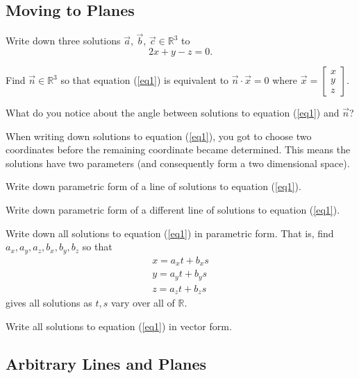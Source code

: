 \documentclass{problemset}
\newcommand{\R}{\mathbb{R}}
\begin{document}
	\subsection*{Moving to Planes}
	
	\question
	\begin{parts}
		\item Write down three solutions $\vec a$, $\vec b$, $\vec c\in\R^3$ to
		\begin{equation}\label{eq1}
			2x+y-z=0.
		\end{equation}
		\item Find $\vec n\in\R^3$ so that equation (\ref{eq1}) is equivalent
		to $\vec n\cdot \vec x=0$ where $\vec x=\begin{bmatrix}x\\ y\\ z\end{bmatrix}$.
		\item What do you notice about the angle between solutions to equation (\ref{eq1}) and $\vec n$?
	\end{parts}

	When writing down solutions to equation (\ref{eq1}), you got to choose two coordinates before the remaining
	coordinate became determined.  This means the solutions have two parameters (and consequently form a
	two dimensional space).

	\begin{parts}[resume]
		\item Write down parametric form of a line of solutions to equation (\ref{eq1}).
		\item Write down parametric form of a different line of solutions to equation (\ref{eq1}).
		\item Write down all solutions to equation (\ref{eq1}) in parametric form.  That is, find $a_x,
		a_y,a_z,b_x,b_y,b_z$ so that
		\[
			\begin{array}{l}
				x=a_x t+b_x s\\
				y=a_y t+b_y s\\
				z=a_z t+b_z s
			\end{array}
		\]
		gives all solutions as $t,s$ vary over all of $\R$.
		\item Write all solutions to equation (\ref{eq1}) in vector form.
	\end{parts}

\subsection*{Arbitrary Lines and Planes}
	
\end{document}
